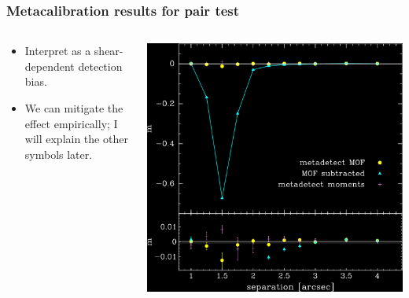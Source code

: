 \documentclass{beamer}
\begin{document}
\begin{frame}
    \frametitle{Metacalibration results for pair test}

 
    \begin{columns}
        \begin{column}{0.4\textwidth}
            \begin{itemize}

                \item Interpret as a shear-dependent detection bias.

                \item We can mitigate the effect empirically; I will explain
                    the other symbols later.

            \end{itemize}
        \end{column}
        \begin{column}{0.6\textwidth}
            \begin{center}
                \includegraphics[width=\columnwidth]{pairs-mc-bdkpair-negate.png}
            \end{center}
        \end{column}
    \end{columns}
\end{frame}
\end{document}
